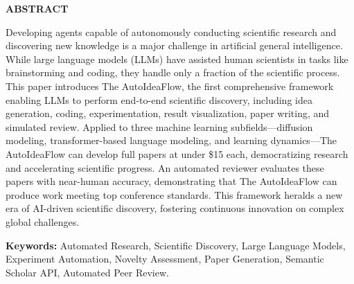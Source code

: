 \newpage


\begin{center}
  \Large\textbf{ABSTRACT}
\end{center}

\begin{justify}

\linespread{1.5}
\normalsize Developing agents capable of autonomously conducting scientific research and discovering new knowledge is a major challenge in artificial general intelligence. While large language models (LLMs) have assisted human scientists in tasks like brainstorming and coding, they handle only a fraction of the scientific process. This paper introduces The AutoIdeaFlow, the first comprehensive framework enabling LLMs to perform end-to-end scientific discovery, including idea generation, coding, experimentation, result visualization, paper writing, and simulated review. Applied to three machine learning subfields—diffusion modeling, transformer-based language modeling, and learning dynamics—The AutoIdeaFlow can develop full papers at under \$15 each, democratizing research and accelerating scientific progress. An automated reviewer evaluates these papers with near-human accuracy, demonstrating that The AutoIdeaFlow can produce work meeting top conference standards. This framework heralds a new era of AI-driven scientific discovery, fostering continuous innovation on complex global challenges.
\vspace{1cm}
\begin{justify}
  \textbf{Keywords:}  Automated Research, Scientific Discovery, Large Language Models, Experiment Automation, Novelty Assessment, Paper Generation, Semantic Scholar API, Automated Peer Review. 
\end{justify}
\end{justify}